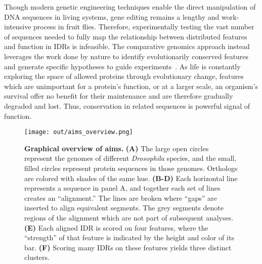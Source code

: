 Though modern genetic engineering techniques enable the direct manipulation of DNA sequences in living systems, gene editing remains a lengthy and work-intensive process in fruit flies. Therefore, experimentally testing the vast number of sequences needed to fully map the relationship between distributed features and function in IDRs is infeasible. The comparative genomics approach instead leverages the work done by nature to identify evolutionarily conserved features and generate specific hypotheses to guide experiments~\cite{Hardison2003}. As life is constantly exploring the space of allowed proteins through evolutionary change, features which are unimportant for a protein's function, or at a larger scale, an organism's survival offer no benefit for their maintenance and are therefore gradually degraded and lost. Thus, conservation in related sequences is powerful signal of function.

\begin{figure}[h!]
\texttt{[image: out/aims\_overview.png]}
\centering
\caption{\textbf{Graphical overview of aims.}
\textbf{(A)} The large open circles represent the genomes of different \textit{Drosophila} species, and the small, filled circles represent protein sequences in those genomes. Orthologs are colored with shades of the same hue. \textbf{(B-D)} Each horizontal line represents a sequence in panel A, and together each set of lines creates an ``alignment.'' The lines are broken where ``gaps'' are inserted to align equivalent segments. The grey segments denote regions of the alignment which are not part of subsequent analyses. \textbf{(E)} Each aligned IDR is scored on four features, where the ``strength'' of that feature is indicated by the height and color of its bar. \textbf{(F)} Scoring many IDRs on these features yields three distinct clusters.}
\label{fig:aims_overview}
\end{figure}

